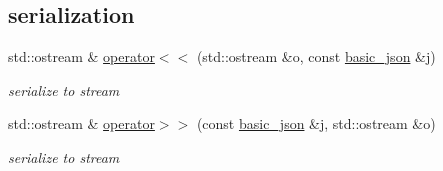 \subsection*{serialization}
\begin{DoxyCompactItemize}
\item 
std\+::ostream \& \hyperlink{classnlohmann_1_1basic__json_a5e34c5435e557d0bf666bd7311211405}{operator$<$$<$} (std\+::ostream \&o, const \hyperlink{classnlohmann_1_1basic__json}{basic\+\_\+json} \&j)
\begin{DoxyCompactList}\small\item\em serialize to stream \end{DoxyCompactList}\item 
std\+::ostream \& \hyperlink{classnlohmann_1_1basic__json_a34d6a60dd99e9f33b8273a1c8db5669b}{operator$>$$>$} (const \hyperlink{classnlohmann_1_1basic__json}{basic\+\_\+json} \&j, std\+::ostream \&o)
\begin{DoxyCompactList}\small\item\em serialize to stream \end{DoxyCompactList}\end{DoxyCompactItemize}

